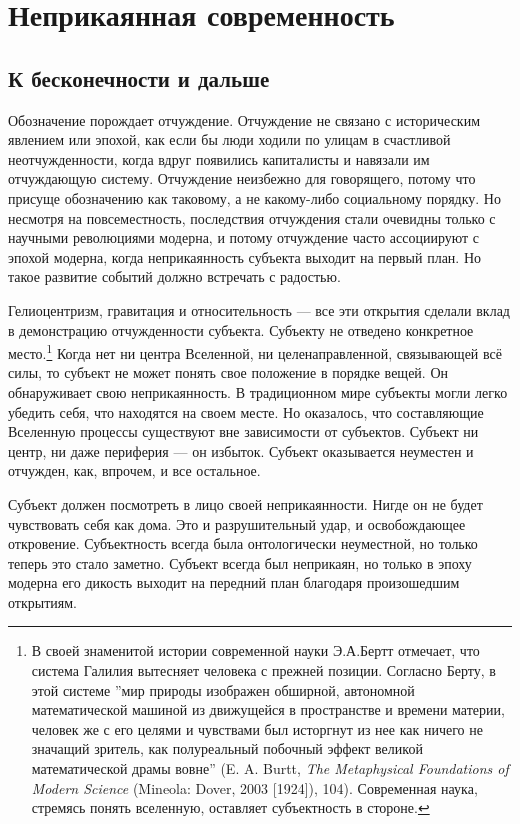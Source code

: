 \documentclass[12pt]{book}
\begin{document}
\chapter{Неприкаянная современность}

\section{К бесконечности и дальше}

Обозначение порождает отчуждение. Отчуждение не связано с историческим явлением или эпохой, как если бы люди ходили по улицам в счастливой неотчужденности, когда вдруг появились капиталисты и навязали им отчуждающую систему. Отчуждение неизбежно для говорящего, потому что присуще обозначению как таковому, а не какому-либо социальному порядку. Но несмотря на повсеместность, последствия отчуждения стали очевидны только с научными революциями модерна, и потому отчуждение часто ассоциируют с эпохой модерна, когда неприкаянность субъекта выходит на первый план. Но такое развитие событий должно встречать с радостью.

Гелиоцентризм, гравитация и относительность --- все эти открытия сделали вклад в демонстрацию отчужденности субъекта. Субъекту не отведено конкретное место.\footnote{В своей знаменитой истории современной науки Э.А.Бертт отмечает, что система Галилия вытесняет человека с прежней позиции. Согласно Берту, в этой системе ''мир природы изображен обширной, автономной математической машиной из движущейся в пространстве и времени материи, человек же с его целями и чувствами был исторгнут из нее как ничего не значащий зритель, как полуреальный побочный эффект великой математической драмы вовне'' (E. A. Burtt, \textit{The Metaphysical Foundations of Modern Science} (Mineola: Dover, 2003 [1924]), 104). Современная наука, стремясь понять вселенную, оставляет субъектность в стороне.} Когда нет ни центра Вселенной, ни целенаправленной, связывающей всё силы, то субъект не может понять свое положение в порядке вещей. Он обнаруживает свою неприкаянность. В традиционном мире субъекты могли легко убедить себя, что находятся на своем месте. Но оказалось, что составляющие Вселенную процессы существуют вне зависимости от субъектов. Субъект ни центр, ни даже периферия --- он избыток. Субъект оказывается неуместен и отчужден, как, впрочем, и все остальное.

Субъект должен посмотреть в лицо своей неприкаянности. Нигде он не будет чувствовать себя как дома. Это и разрушительный удар, и освобождающее откровение. Субъектность всегда была онтологически неуместной, но только теперь это стало заметно. Субъект всегда был неприкаян, но только в эпоху модерна его дикость выходит на передний план благодаря произошедшим открытиям.
\end{document}
